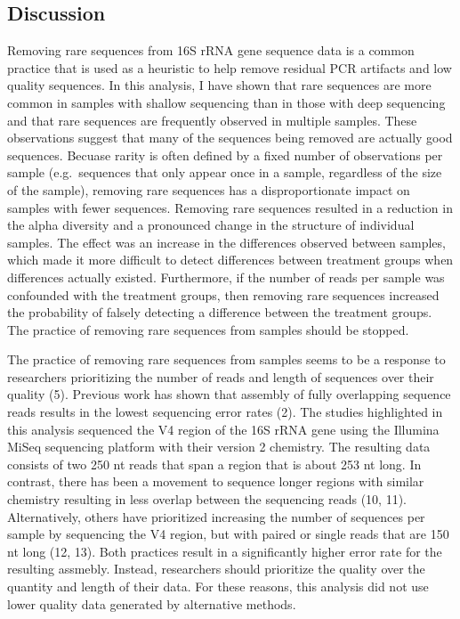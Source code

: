 \documentclass[
]{article}
\begin{document}
\hypertarget{discussion}{%
\subsection{Discussion}\label{discussion}}

Removing rare sequences from 16S rRNA gene sequence data is a common
practice that is used as a heuristic to help remove residual PCR
artifacts and low quality sequences. In this analysis, I have shown that
rare sequences are more common in samples with shallow sequencing than
in those with deep sequencing and that rare sequences are frequently
observed in multiple samples. These observations suggest that many of
the sequences being removed are actually good sequences. Becuase rarity
is often defined by a fixed number of observations per sample
(e.g.~sequences that only appear once in a sample, regardless of the
size of the sample), removing rare sequences has a disproportionate
impact on samples with fewer sequences. Removing rare sequences resulted
in a reduction in the alpha diversity and a pronounced change in the
structure of individual samples. The effect was an increase in the
differences observed between samples, which made it more difficult to
detect differences between treatment groups when differences actually
existed. Furthermore, if the number of reads per sample was confounded
with the treatment groups, then removing rare sequences increased the
probability of falsely detecting a difference between the treatment
groups. The practice of removing rare sequences from samples should be
stopped.

The practice of removing rare sequences from samples seems to be a
response to researchers prioritizing the number of reads and length of
sequences over their quality (5). Previous work has shown that assembly
of fully overlapping sequence reads results in the lowest sequencing
error rates (2). The studies highlighted in this analysis sequenced the
V4 region of the 16S rRNA gene using the Illumina MiSeq sequencing
platform with their version 2 chemistry. The resulting data consists of
two 250 nt reads that span a region that is about 253 nt long. In
contrast, there has been a movement to sequence longer regions with
similar chemistry resulting in less overlap between the sequencing reads
(10, 11). Alternatively, others have prioritized increasing the number
of sequences per sample by sequencing the V4 region, but with paired or
single reads that are 150 nt long (12, 13). Both practices result in a
significantly higher error rate for the resulting assmebly. Instead,
researchers should prioritize the quality over the quantity and length
of their data. For these reasons, this analysis did not use lower
quality data generated by alternative methods.
\end{document}
